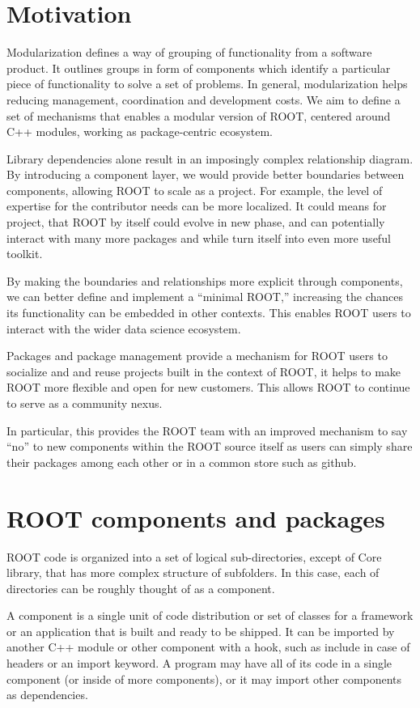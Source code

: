 \documentclass{webofc}
\begin{document}
\section{Motivation}

Modularization defines a way of grouping of functionality from a software product. It outlines groups in form of components which identify a particular piece of functionality to solve a set of problems. In general, modularization helps reducing management, coordination and development costs. We aim to define a set of mechanisms that enables a modular version of ROOT, centered around C++ modules, working as package-centric ecosystem.

Library dependencies alone result in an imposingly complex relationship diagram. By introducing a component layer, we would provide better boundaries between components, allowing ROOT to scale as a project. For example, the level of expertise for the contributor needs can be more localized. It could means for project, that ROOT by itself could evolve in new phase, and can potentially interact with many more packages and while turn itself into even more useful toolkit. 

By making the boundaries and relationships more explicit through components, we can better define and implement a “minimal ROOT,” increasing the chances its functionality can be embedded in other contexts.  This enables ROOT users to interact with the wider data science ecosystem.

Packages and package management provide a mechanism for ROOT users to socialize and and reuse projects built in the context of ROOT, it helps to make ROOT more flexible and open for new customers.  This allows ROOT to continue to serve as a community nexus.

In particular, this provides the ROOT team with an improved mechanism to say “no” to new components within the ROOT source itself as users can simply share their packages among each other or in a common store such as github.

\section{ROOT components and packages}

ROOT code is organized into a set of logical sub-directories, except of Core library, that has more complex structure of subfolders. In this case, each of directories can be roughly thought of as a component. 

A component is a single unit of code distribution or set of classes for a framework or an application that is built and ready to be shipped. It can be imported by another C++ module \cite{cxxmodules} or other component with a hook, such as  include in case of headers or an import keyword. A program may have all of its code in a single component (or inside of more components), or it may import other components as dependencies.
\end{document}

